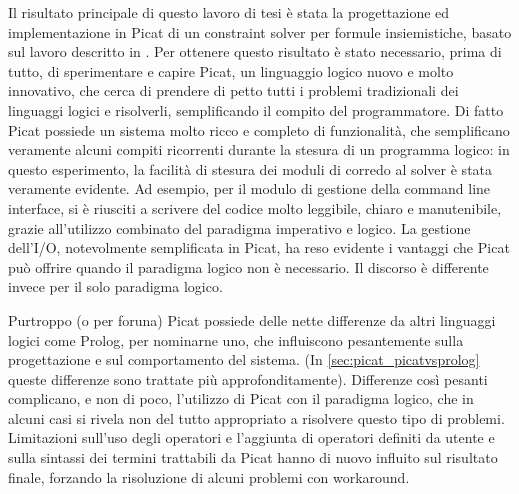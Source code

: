 \documentclass[12pt,a4paper,openright]{book} %
\begin{document}
Il risultato principale di questo lavoro di tesi è stata la
progettazione ed implementazione in Picat di un constraint solver per
formule insiemistiche, basato sul lavoro descritto in
\cite{Dovier00}. Per ottenere questo risultato è stato necessario,
prima di tutto, di sperimentare e capire Picat, un linguaggio logico
nuovo e molto innovativo, che cerca di prendere di petto tutti i
problemi tradizionali dei linguaggi logici e risolverli, semplificando
il compito del programmatore. Di fatto Picat possiede un sistema molto
ricco e completo di funzionalità, che semplificano veramente alcuni
compiti ricorrenti durante la stesura di un programma logico: in
questo esperimento, la facilità di stesura dei moduli di corredo al
solver è stata veramente evidente. Ad esempio, per il modulo di
gestione della command line interface, si è riusciti a scrivere del
codice molto leggibile, chiaro e manutenibile, grazie all'utilizzo
combinato del paradigma imperativo e logico. La gestione dell'I/O,
notevolmente semplificata in Picat, ha reso evidente i vantaggi che
Picat può offrire quando il paradigma logico non è necessario. Il
discorso è differente invece per il solo paradigma logico.

Purtroppo
(o per foruna) Picat possiede delle nette differenze da altri
linguaggi logici come Prolog, per nominarne uno, che influiscono
pesantemente sulla progettazione e sul comportamento del sistema. (In
\ref{sec:picat_picatvsprolog} queste differenze sono trattate più
approfonditamente). Differenze così pesanti complicano, e non di poco,
l'utilizzo di Picat con il paradigma logico, che in alcuni casi si
rivela non del tutto appropriato a risolvere questo tipo di
problemi. Limitazioni sull'uso degli operatori e l'aggiunta di
operatori definiti da utente e sulla sintassi dei termini trattabili
da Picat hanno di nuovo influito sul risultato finale, forzando la
risoluzione di alcuni problemi con workaround.
\end{document}

